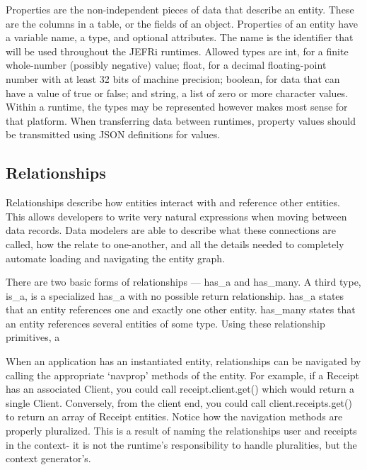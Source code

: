 \documentclass{article}
\renewcommand{\|}{\textbar}
\begin{document}
Properties are the non-independent pieces of data that describe an entity. These
are the columns in a table, or the fields of an object. Properties of an entity
have a variable {\ilcode name}, a {\ilcode type}, and optional {\ilcode
attributes}. The name is the identifier that will be used throughout the JEFRi
runtimes. Allowed types are {\ilcode int}, for a finite whole-number (possibly
negative) value; {\ilcode float}, for a decimal floating-point number with at
least 32 bits of machine precision; {\ilcode boolean}, for data that can have a
value of {\ilcode true} or {\ilcode false}; and {\ilcode string}, a list of zero
or more character values. Within a runtime, the types may be represented however
makes most sense for that platform. When transferring data between runtimes,
property values should be transmitted using JSON definitions for values.

\subsection{Relationships}

Relationships describe how entities interact with and reference other entities.
This allows developers to write very natural expressions when moving between
data records. Data modelers are able to describe what these connections are
called, how the relate to one-another, and all the details needed to completely
automate loading and navigating the entity graph.

There are two basic forms of relationships --- {\ilcode has\_a} and {\ilcode
has\_many}. A third type, {\ilcode is\_a}, is a specialized {\ilcode has\_a}
with no possible return relationship. {\ilcode has\_a} states that an entity
references one and exactly one other entity. {\ilcode has\_many} states that an
entity references several entities of some type. Using these relationship
primitives, a

When an application has an instantiated entity, relationships can be navigated
by calling the appropriate {\ilcode `navprop'} methods of the entity. For
example, if a Receipt has an associated Client, you could call {\ilcode
receipt.client.get()} which would return a single Client. Conversely, from the
client end, you could call {\ilcode client.receipts.get()} to return an array
of Receipt entities. Notice how the navigation methods are properly pluralized.
This is a result of naming the relationships {\ilcode user} and {\ilcode
receipts} in the context- it is not the runtime's responsibility to handle
pluralities, but the context generator's.
\end{document}
